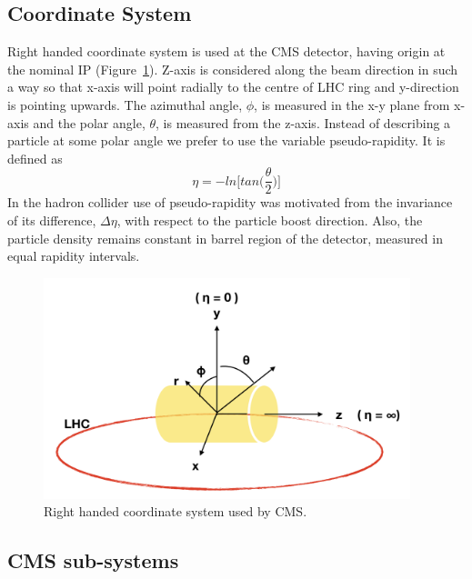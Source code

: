 \subsection{Coordinate System} %
\label{sub:coordinate_system}
Right handed coordinate system is used at the CMS detector, having origin at the nominal IP (Figure~\ref{fig:cms-coordinate-system}). Z-axis is considered along the beam direction in such a way so that x-axis will point radially to the centre of LHC ring and y-direction is pointing upwards. The azimuthal angle, $\phi$, is measured in the x-y plane from x-axis and the polar angle, $\theta$, is measured from the z-axis. Instead of describing a particle at some polar angle we prefer to use the variable pseudo-rapidity. It is defined as 
\begin{equation}
	\eta = -ln\bigg[tan\Big(\frac{\theta}{2}\Big)\bigg]
\end{equation}
In the hadron collider use of pseudo-rapidity was motivated from the invariance of its difference, $\Delta \eta$, with respect to the particle boost direction. Also, the particle density remains constant in barrel region of the detector, measured in equal rapidity intervals.

\begin{figure}[htbp]
	\centering
	\includegraphics[width=0.95\textwidth]{figures/LHC/CMS-coordinate-system.png}
	\caption{Right handed coordinate system used by CMS.}
	\label{fig:cms-coordinate-system}
\end{figure}

\subsection{CMS sub-systems} %
\label{sub:cms_sub_systems}

